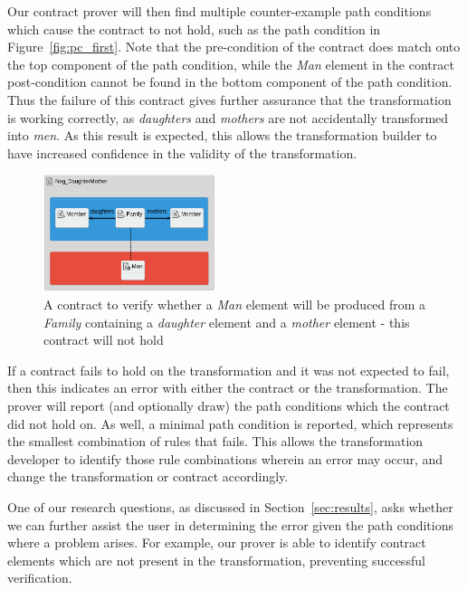 Our contract prover will then find multiple
 counter-example path conditions which cause the contract to not hold, such as the path condition in Figure~\ref{fig:pc_first}. Note that the
pre-condition of the contract does match onto the top component of the path condition, while the
\textit{Man} element in the contract post-condition cannot be found in the bottom component of the path condition. Thus the failure of this contract gives further
assurance that the transformation is working correctly, as \textit{daughters}
and \textit{mothers} are not accidentally transformed into \textit{men}. As this result is expected, this allows the transformation builder to have increased confidence in the validity of the transformation.


  \begin{figure}[t]
    \begin{center}
      \includegraphics[width=0.45\textwidth]{figures/FamToPersons/Neg_DaughterMother}
      \caption{A contract to verify whether a \emph{Man} element will be produced from a \emph{Family} containing a \emph{daughter} element and a \emph{mother} element - this contract will not hold}
      \label{fig:daughterMother}
    \end{center}
    \vspace{-0.20in}
  \end{figure}

If a contract fails to hold on the transformation and it was not expected to fail, then this indicates an error with either the contract or the transformation. The prover will report (and optionally draw) the path conditions which the contract did not hold on. As well, a minimal path condition is reported, which represents the smallest combination of rules that fails. This allows the transformation developer to identify those rule combinations wherein an error may occur, and change the transformation or contract accordingly.

One of our research questions, as discussed in Section~\ref{sec:results}, asks whether we can further assist the user in determining the error given the path conditions where a problem arises. For example, our prover is able to identify contract elements which are not present in the transformation, preventing successful verification.


